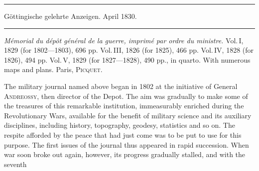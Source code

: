 \begin{center}
\rule{.85\textwidth}{.3pt}\par
Göttingische gelehrte Anzeigen. April 1830.\par
\rule{.85\textwidth}{.3pt}
\end{center}
\hspace*{\parindent}\textit{Mémorial du dépôt général de la guerre, imprimé par ordre du ministre.} Vol.\,I, 1829 (for 1802---1803), 696 pp. Vol.\,III, 1826 (for 1825), 466 pp. Vol.\,IV, 1828 (for 1826), 494 pp. Vol.\,V, 1829 (for 1827---1828), 490 pp., in quarto. With numerous maps and plans. Paris, \textsc{Picquet}.

The military journal named above began in 1802 at the initiative of General \textsc{Andreossy}, then director of the Depot. The aim was gradually to make some of the treasures of this remarkable institution, immeasurably enriched during the Revolutionary Wars, available for the benefit of military science and its auxiliary disciplines, including history, topography, geodesy, statistics and so on. The respite afforded by the peace that had just come was to be put to use for this purpose. The first issues of the journal thus appeared in rapid succession. When war soon broke out again, however, its progress gradually stalled, and with the seventh
